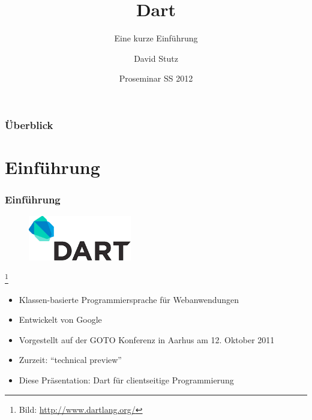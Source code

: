 \documentclass{beamer}
\begin{document}
\title{Dart}
\subtitle{Eine kurze Einführung}
\author{David Stutz}
\date{Proseminar SS 2012}
\subject{Dart}


\frame{\titlepage}

\begin{frame}
\frametitle{Überblick}
\tableofcontents
\end{frame}

\section{Einführung}
\begin{frame}
\frametitle{Einführung}

\begin{figure}[htb]
	\centering
 		\includegraphics[width=0.4\textwidth]{images/dart-logo.png}
\end{figure}\footnote{Bild: \url{http://www.dartlang.org/}}

\begin{itemize}
\item Klassen-basierte Programmiersprache für Webanwendungen
\item Entwickelt von Google
\pause
\item Vorgestellt auf der GOTO Konferenz in Aarhus am 12. Oktober 2011
\pause
\item Zurzeit: ``technical preview''
\pause
\item Diese Präsentation: Dart für clientseitige Programmierung
\end{itemize}
\end{frame}
\end{document}
